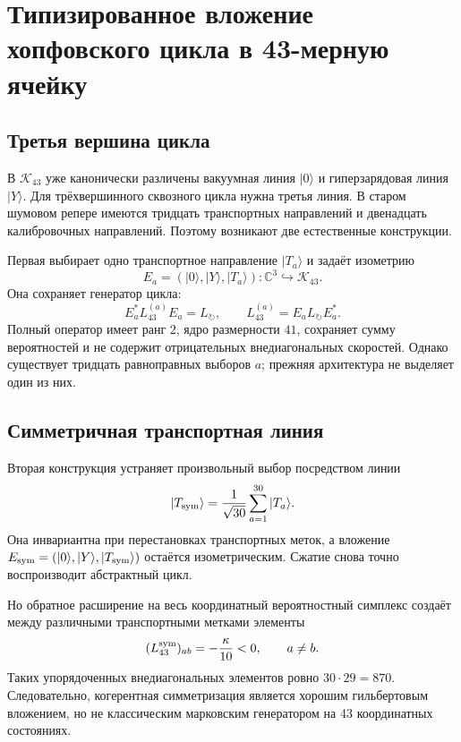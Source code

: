 \chapter{Типизированное вложение хопфовского цикла в 43-мерную ячейку}
\label{ch:v10-hopf-cycle-k43-typed-embedding}

\section{Третья вершина цикла}

В $\mathcal K_{43}$ уже канонически различены вакуумная линия $|0\rangle$ и
гиперзарядовая линия $|Y\rangle$. Для трёхвершинного сквозного цикла нужна
третья линия. В старом шумовом репере имеются тридцать транспортных
направлений и двенадцать калибровочных направлений. Поэтому возникают две
естественные конструкции.

Первая выбирает одно транспортное направление $|T_a\rangle$ и задаёт
изометрию
\begin{equation}
 E_a=(|0\rangle,|Y\rangle,|T_a\rangle):
 \mathbb C^3\hookrightarrow\mathcal K_{43}.
 \label{eq:v10-hopf-coordinate-embedding}
\end{equation}
Она сохраняет генератор цикла:
\begin{equation}
 E_a^*L_{43}^{(a)}E_a=L_\circlearrowright,
 \qquad
 L_{43}^{(a)}=E_aL_\circlearrowright E_a^*.
 \label{eq:v10-hopf-coordinate-compression}
\end{equation}
Полный оператор имеет ранг $2$, ядро размерности $41$, сохраняет сумму
вероятностей и не содержит отрицательных внедиагональных скоростей.
Однако существует тридцать равноправных выборов $a$; прежняя архитектура не
выделяет один из них.

\section{Симметричная транспортная линия}

Вторая конструкция устраняет произвольный выбор посредством линии
\begin{equation}
 |T_{\rm sym}\rangle
 =\frac1{\sqrt{30}}\sum_{a=1}^{30}|T_a\rangle.
 \label{eq:v10-hopf-symmetric-transfer-line}
\end{equation}
Она инвариантна при перестановках транспортных меток, а вложение
$E_{\rm sym}=(|0\rangle,|Y\rangle,|T_{\rm sym}\rangle)$ остаётся
изометрическим. Сжатие снова точно воспроизводит абстрактный цикл.

Но обратное расширение на весь координатный вероятностный симплекс создаёт
между различными транспортными метками элементы
\begin{equation}
 (L_{43}^{\rm sym})_{ab}=-\frac{\kappa}{10}<0,
 \qquad a\ne b.
 \label{eq:v10-hopf-symmetric-negative-rate}
\end{equation}
Таких упорядоченных внедиагональных элементов ровно
$30\cdot29=870$. Следовательно, когерентная симметризация является хорошим
гильбертовым вложением, но не классическим марковским генератором на 43
координатных состояниях.

